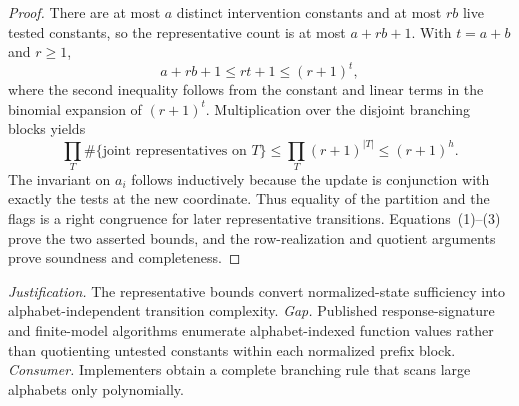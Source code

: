 \documentclass{article}
\begin{document}
\begin{proof}
There are at most \(a\) distinct intervention constants and at most \(rb\) live tested constants, so the representative count is at most \(a+rb+1\).  With \(t=a+b\) and \(r\geq1\),
\[
 a+rb+1\leq rt+1\leq(r+1)^t,
\tag{2}
\]
where the second inequality follows from the constant and linear terms in the binomial expansion of \((r+1)^t\).  Multiplication over the disjoint branching blocks yields
\[
 \prod_T\#\{\text{joint representatives on }T\}
 \leq\prod_T(r+1)^{|T|}
 \leq(r+1)^h.
\tag{3}
\]
The invariant on \(a_i\) follows inductively because the update is conjunction with exactly the tests at the new coordinate.  Thus equality of the partition and the flags is a right congruence for later representative transitions.  Equations~(1)--(3) prove the two asserted bounds, and the row-realization and quotient arguments prove soundness and completeness.
\end{proof}
\par\smallskip\noindent \textit{Justification.} The representative bounds convert normalized-state sufficiency into alphabet-independent transition complexity. \textit{Gap.} Published response-signature and finite-model algorithms enumerate alphabet-indexed function values rather than quotienting untested constants within each normalized prefix block. \textit{Consumer.} Implementers obtain a complete branching rule that scans large alphabets only polynomially.
\end{document}
